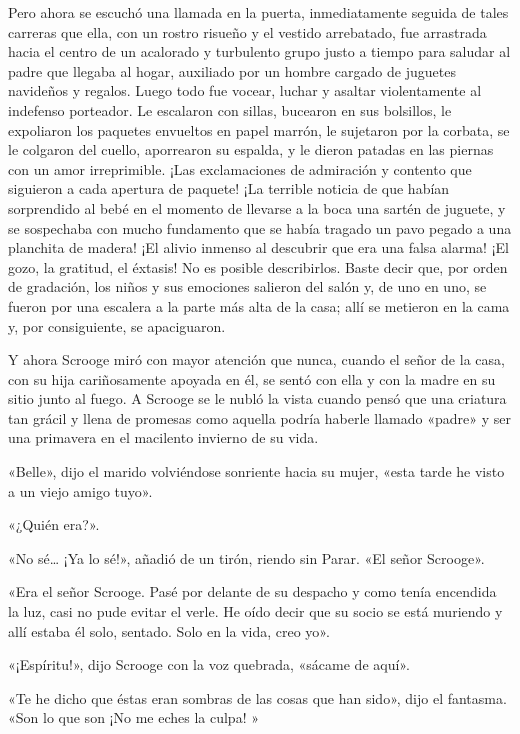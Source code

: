 \documentclass{novela}
\begin{document}
 Pero ahora se escuchó una llamada en la puerta, inmediatamente seguida de tales carreras que ella, con un rostro risueño y el vestido arrebatado, fue arrastrada hacia el centro de un acalorado y turbulento grupo justo a tiempo para saludar al padre que llegaba al hogar, auxiliado por un hombre cargado de juguetes navideños y regalos. Luego todo fue vocear, luchar y asaltar violentamente al indefenso porteador. Le escalaron con sillas, bucearon en sus bolsillos, le expoliaron los paquetes envueltos en papel marrón, le sujetaron por la corbata, se le colgaron del cuello, aporrearon su espalda, y le dieron patadas en las piernas con un amor irreprimible. ¡Las exclamaciones de admiración y contento que siguieron a cada apertura de paquete! ¡La terrible noticia de que habían sorprendido al bebé en el momento de llevarse a la boca una sartén de juguete, y se sospechaba con mucho fundamento que se había tragado un pavo pegado a una planchita de madera! ¡El alivio inmenso al descubrir que era una falsa alarma! ¡El gozo, la gratitud, el éxtasis! No es posible describirlos. Baste decir que, por orden de gradación, los niños y sus emociones salieron del salón y, de uno en uno, se fueron por una escalera a la parte más alta de la casa; allí se metieron en la cama y, por consiguiente, se apaciguaron.

 Y ahora Scrooge miró con mayor atención que nunca, cuando el señor de la casa, con su hija cariñosamente apoyada en él, se sentó con ella y con la madre en su sitio junto al fuego. A Scrooge se le nubló la vista cuando pensó que una criatura tan grácil y llena de promesas como aquella podría haberle llamado «padre» y ser una primavera en el macilento invierno de su vida.

 «Belle», dijo el marido volviéndose sonriente hacia su mujer, «esta tarde he visto a un viejo amigo tuyo».

 «¿Quién era?».

 «No sé{\ldots} ¡Ya lo sé!», añadió de un tirón, riendo sin Parar. «El señor Scrooge».

 «Era el señor Scrooge. Pasé por delante de su despacho y como tenía encendida la luz, casi no pude evitar el verle. He oído decir que su socio se está muriendo y allí estaba él solo, sentado. Solo en la vida, creo yo».

 «¡Espíritu!», dijo Scrooge con la voz quebrada, «sácame de aquí».

 «Te he dicho que éstas eran sombras de las cosas que han sido», dijo el fantasma. «Son lo que son ¡No me eches la culpa! »
\end{document}
